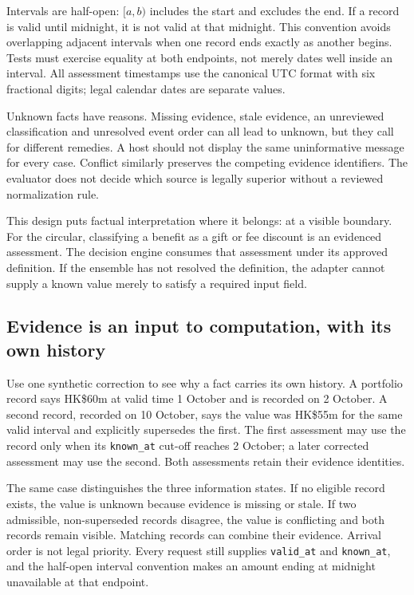 
Intervals are half-open: $[a,b)$ includes the start and excludes the end. If a
record is valid until midnight, it is not valid at that midnight. This convention
avoids overlapping adjacent intervals when one record ends exactly as another
begins. Tests must exercise equality at both endpoints, not merely dates well
inside an interval. All assessment timestamps use the canonical UTC format with
six fractional digits; legal calendar dates are separate values.

Unknown facts have reasons. Missing evidence, stale evidence, an unreviewed
classification and unresolved event order can all lead to unknown, but they call
for different remedies. A host should not display the same uninformative message
for every case. Conflict similarly preserves the competing evidence identifiers.
The evaluator does not decide which source is legally superior without a
reviewed normalization rule.

This design puts factual interpretation where it belongs: at a visible boundary.
For the circular, classifying a benefit as a gift or fee discount is an evidenced
assessment. The decision engine consumes that assessment under its approved
definition. If the ensemble has not resolved the definition, the adapter cannot
supply a known value merely to satisfy a required input field.

\subsection{Evidence is an input to computation, with its own history}
\label{merge:P-03a-rule-contract:01}


Use one synthetic correction to see why a fact carries its own history. A portfolio
record says HK\$60m at valid time 1 October and is recorded on 2 October. A second
record, recorded on 10 October, says the value was HK\$55m for the same valid
interval and explicitly supersedes the first. The first assessment may use the
record only when its \texttt{known\_at} cut-off reaches 2 October; a later corrected
assessment may use the second. Both assessments retain their evidence identities.

The same case distinguishes the three information states. If no eligible record exists,
the value is unknown because evidence is missing or stale. If two admissible,
non-superseded records disagree, the value is conflicting and both records remain
visible. Matching records can combine their evidence. Arrival order is not legal
priority. Every request still supplies \texttt{valid\_at} and \texttt{known\_at},
and the half-open interval convention makes an amount ending at midnight unavailable at that endpoint.

